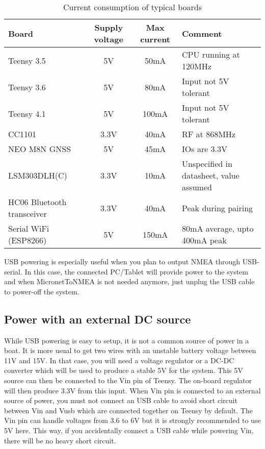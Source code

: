 \documentclass{report}
\begin{document}
\begin{table}[h]
	\begin{tabular}{|l|c|c|l|}
		\hline
		Board & Supply voltage & Max current & Comment \\
		\hline
		Teensy 3.5 & 5V & 50mA & CPU running at 120MHz\\
		Teensy 3.6 & 5V & 80mA & Input not 5V tolerant\\
		Teensy 4.1 & 5V & 100mA & Input not 5V tolerant\\
		CC1101 & 3.3V & 40mA & RF at 868MHz\\
		NEO M8N GNSS & 5V & 45mA & IOs are 3.3V\\
		LSM303DLH(C) & 3.3V & 10mA & Unspecified in datasheet, value assumed\\
		HC06 Bluetooth transceiver & 3.3V & 40mA & Peak during pairing\\
		Serial WiFi (ESP8266) & 5V & 150mA & 80mA average, upto 400mA peak\\
		\hline
	\end{tabular}
	\caption{Current consumption of typical boards}
	\label{table:boardconsumption}
\end{table}
USB powering is especially useful when you plan to output NMEA through USB-serial. In this case, the connected PC/Tablet will provide power to the system and when MicronetToNMEA is not needed anymore, just unplug the USB cable to power-off the system.

\subsection{Power with an external DC source}
While USB powering is easy to setup, it is not a common source of power in a boat. It is more usual to get two wires with an unstable battery voltage between 11V and 15V. In that case, you will need a voltage regulator or a DC-DC converter which will be used to produce a stable 5V for the system. This 5V source can then be connected to the Vin pin of Teensy. The on-board regulator will then produce 3.3V from this input.
\linebreak
When Vin pin is connected to an external source of power, you must not connect an USB cable to avoid short circuit between Vin and Vusb which are connected together on Teensy by default. The Vin pin can handle voltages from 3.6 to 6V but it is strongly recommended to use 5V here. This way, if you accidentally connect a USB cable while powering Vin, there will be no heavy short circuit.
\end{document}
